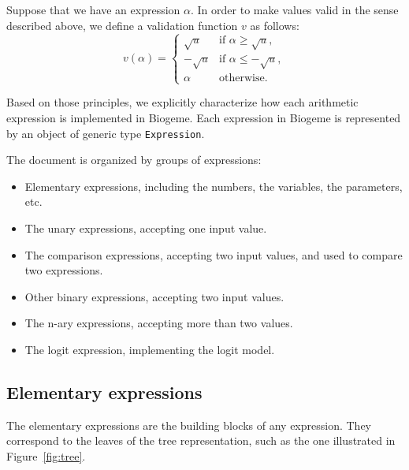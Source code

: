\documentclass[12pt,a4paper]{article}
\begin{document}
Suppose that we have an expression $\alpha$.
In order to make values valid in the sense described above, we define a validation function $v$ as follows:
\begin{equation}
\label{eq:validation}
v(\alpha) = \left\{
\begin{array}{ll}
  \sqrt{u} & \text{if } \alpha \geq \sqrt{u}, \\ 
  -\sqrt{u} & \text{if } \alpha \leq -\sqrt{u}, \\
  \alpha & \text{otherwise}.
\end{array}
\right.
\end{equation}

Based on those principles, we explicitly characterize how each
arithmetic expression is implemented in Biogeme. Each expression in
Biogeme is represented by an object of generic type
\lstinline+Expression+.



The document is organized by groups of expressions:
\begin{itemize}
\item Elementary expressions, including the numbers, the variables, the parameters, etc.
\item The unary expressions, accepting one input value.
\item The comparison expressions, accepting two input values, and used to compare two expressions.
\item Other binary expressions, accepting two input values.
\item The n-ary expressions, accepting more than two values.
\item The logit expression, implementing the logit model.
\end{itemize}



\subsection{Elementary expressions}

The elementary expressions are the building blocks of any expression. They correspond to the leaves of the tree representation, such as the one illustrated in Figure~\ref{fig:tree}.  
\end{document}
